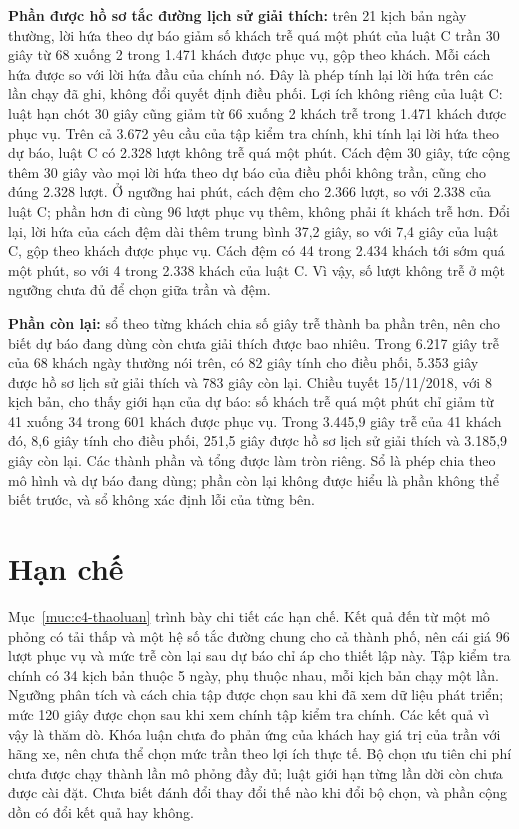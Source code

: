 \textbf{Phần được hồ sơ tắc đường lịch sử giải thích:} trên 21 kịch bản ngày thường, lời hứa theo dự báo giảm số khách trễ quá một phút của luật C trần 30 giây từ 68 xuống 2 trong 1.471 khách được phục vụ, gộp theo khách. Mỗi cách hứa được so với lời hứa đầu của chính nó. Đây là phép tính lại lời hứa trên các lần chạy đã ghi, không đổi quyết định điều phối. Lợi ích không riêng của luật C: luật hạn chót 30 giây cũng giảm từ 66 xuống 2 khách trễ trong 1.471 khách được phục vụ. Trên cả 3.672 yêu cầu của tập kiểm tra chính, khi tính lại lời hứa theo dự báo, luật C có 2.328 lượt không trễ quá một phút. Cách đệm 30 giây, tức cộng thêm 30 giây vào mọi lời hứa theo dự báo của điều phối không trần, cũng cho đúng 2.328 lượt. Ở ngưỡng hai phút, cách đệm cho 2.366 lượt, so với 2.338 của luật C; phần hơn đi cùng 96 lượt phục vụ thêm, không phải ít khách trễ hơn. Đổi lại, lời hứa của cách đệm dài thêm trung bình 37,2 giây, so với 7,4 giây của luật C, gộp theo khách được phục vụ. Cách đệm có 44 trong 2.434 khách tới sớm quá một phút, so với 4 trong 2.338 khách của luật C. Vì vậy, số lượt không trễ ở một ngưỡng chưa đủ để chọn giữa trần và đệm.

\textbf{Phần còn lại:} sổ theo từng khách chia số giây trễ thành ba phần trên, nên cho biết dự báo đang dùng còn chưa giải thích được bao nhiêu. Trong 6.217 giây trễ của 68 khách ngày thường nói trên, có 82 giây tính cho điều phối, 5.353 giây được hồ sơ lịch sử giải thích và 783 giây còn lại. Chiều tuyết 15/11/2018, với 8 kịch bản, cho thấy giới hạn của dự báo: số khách trễ quá một phút chỉ giảm từ 41 xuống 34 trong 601 khách được phục vụ. Trong 3.445,9 giây trễ của 41 khách đó, 8,6 giây tính cho điều phối, 251,5 giây được hồ sơ lịch sử giải thích và 3.185,9 giây còn lại. Các thành phần và tổng được làm tròn riêng. Sổ là phép chia theo mô hình và dự báo đang dùng; phần còn lại không được hiểu là phần không thể biết trước, và sổ không xác định lỗi của từng bên.

\section{Hạn chế}
\label{muc:c5-hanche}

Mục~\ref{muc:c4-thaoluan} trình bày chi tiết các hạn chế. Kết quả đến từ một mô phỏng có tải thấp và một hệ số tắc đường chung cho cả thành phố, nên cái giá 96 lượt phục vụ và mức trễ còn lại sau dự báo chỉ áp cho thiết lập này. Tập kiểm tra chính có 34 kịch bản thuộc 5 ngày, phụ thuộc nhau, mỗi kịch bản chạy một lần. Ngưỡng phân tích và cách chia tập được chọn sau khi đã xem dữ liệu phát triển; mức 120 giây được chọn sau khi xem chính tập kiểm tra chính. Các kết quả vì vậy là thăm dò. Khóa luận chưa đo phản ứng của khách hay giá trị của trần với hãng xe, nên chưa thể chọn mức trần theo lợi ích thực tế. Bộ chọn ưu tiên chi phí chưa được chạy thành lần mô phỏng đầy đủ; luật giới hạn từng lần dời còn chưa được cài đặt. Chưa biết đánh đổi thay đổi thế nào khi đổi bộ chọn, và phần cộng dồn có đổi kết quả hay không.

